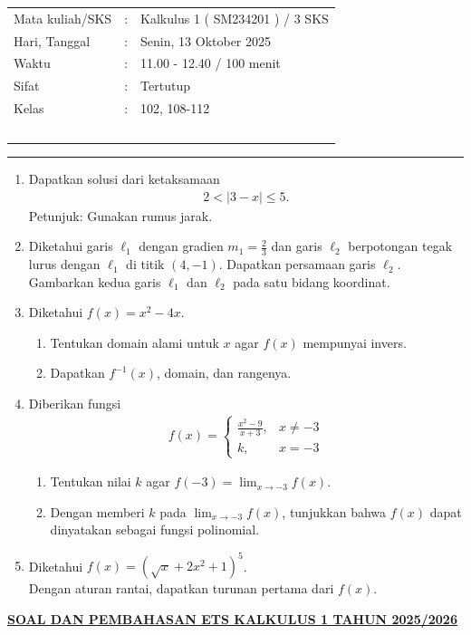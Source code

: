 \documentclass[10pt,openany,a4paper]{article}
\theoremstyle{definition}
\theoremstyle{definition}
\theoremstyle{plain}
\begin{document}
    \begin{center}
	\begin{tabular}{lcl}
		Mata kuliah/SKS & : & Kalkulus 1 ( SM234201 ) / 3 SKS\\
		Hari, Tanggal & : & Senin, 13 Oktober 2025\\
		Waktu & : & 11.00 - 12.40 / 100 menit\\
		Sifat & : & Tertutup\\
		Kelas & : & 102, 108-112\\
  ~
	\end{tabular}
    
    \noindent\rule{\textwidth}{2.pt}
        \end{center}
        \begin{enumerate}
            \item Dapatkan solusi dari ketaksamaan 
            \begin{align*}
                2<|3-x|\leq 5.
            \end{align*}
            Petunjuk: Gunakan rumus jarak.
            \item Diketahui garis $\ell_1$ dengan gradien $m_1=\frac{2}{3}$ dan garis $\ell_2$ berpotongan tegak lurus dengan $\ell_1$ di titik $(4,-1)$. Dapatkan persamaan garis $\ell_2$. \\
            Gambarkan kedua garis $\ell_1$ dan $\ell_2$ pada satu bidang koordinat. 
            \item Diketahui $f(x)=x^2-4x$.
            \begin{enumerate}
                \item Tentukan domain alami untuk $x$ agar $f(x)$ mempunyai invers.
                \item Dapatkan $f^{-1}(x)$, domain, dan rangenya. 
            \end{enumerate}
            \item Diberikan fungsi 
            \begin{align*}
                f(x)=\begin{cases}
                    \frac{x^2-9}{x+3}, &x\neq -3\\
                    k, &x=-3
                \end{cases}
            \end{align*}
            \begin{enumerate}
                \item Tentukan nilai $k$ agar $f(-3)=\displaystyle\lim_{x\to -3} f(x)$.
                \item Dengan memberi $k$ pada $\lim_{x\to-3} f(x)$, tunjukkan bahwa $f(x)$ dapat dinyatakan sebagai fungsi polinomial. 
            \end{enumerate}
            \item Diketahui $f(x)=(\sqrt{x}+2x^2+1)^5$.\\
            Dengan aturan rantai, dapatkan turunan pertama dari $f(x)$.
        \end{enumerate}
               \newpage
 \begin{center}
	{\underline{\textbf{\MakeUppercase{Soal dan Pembahasan ETS Kalkulus 1 Tahun 2025/2026}}}}
    \end{center}
\end{document}
